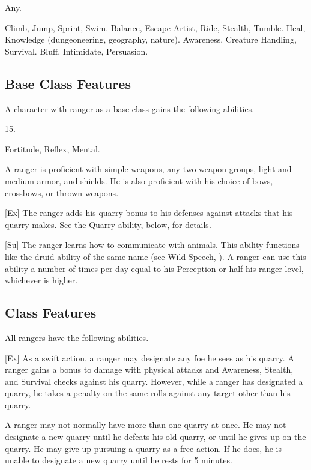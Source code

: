  Any.

 Climb, Jump, Sprint, Swim.
 Balance, Escape Artist, Ride, Stealth, Tumble.
 Heal, Knowledge (dungeoneering, geography, nature).
 Awareness, Creature Handling, Survival.
 Bluff, Intimidate, Persuasion.

\subsection{Base Class Features}
A character with ranger as a base class gains the following abilities.

 15.

  Fortitude,  Reflex,  Mental.

 A ranger is proficient with simple weapons, any two weapon groups, light and medium armor, and shields.
He is also proficient with his choice of bows, crossbows, or thrown weapons.

[Ex]
The ranger adds his quarry bonus to his defenses against attacks that his quarry makes.
See the Quarry ability, below, for details.

[Su]
The ranger learns how to communicate with animals.
This ability functions like the druid ability of the same name (see Wild Speech, ).
A ranger can use this ability a number of times per day equal to his Perception or half his ranger level, whichever is higher.

\subsection{Class Features}
All rangers have the following abilities.

[Ex]
As a swift action, a ranger may designate any foe he sees as his quarry.
A ranger gains a  bonus to damage with physical attacks and Awareness, Stealth, and Survival checks against his quarry.
However, while a ranger has designated a quarry, he takes a  penalty on the same rolls against any target other than his quarry.

A ranger may not normally have more than one quarry at once.
He may not designate a new quarry until he defeats his old quarry, or until he gives up on the quarry.
He may give up pursuing a quarry as a free action.
If he does, he is unable to designate a new quarry until he rests for 5 minutes.


